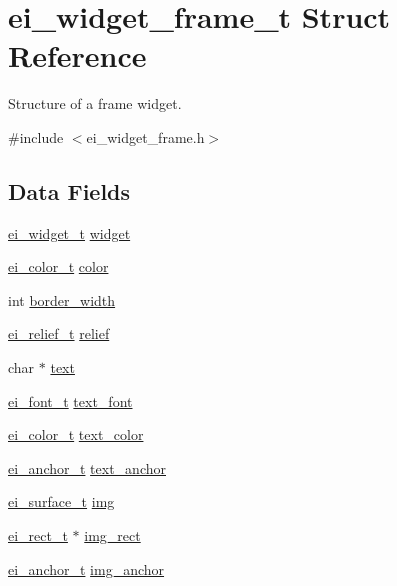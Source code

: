 \hypertarget{structei__widget__frame__t}{\section{ei\-\_\-widget\-\_\-frame\-\_\-t Struct Reference}
\label{structei__widget__frame__t}
}


Structure of a frame widget.  




{\ttfamily \#include $<$ei\-\_\-widget\-\_\-frame.\-h$>$}

\subsection*{Data Fields}
\begin{DoxyCompactItemize}
\item 
\hyperlink{structei__widget__t}{ei\-\_\-widget\-\_\-t} \hyperlink{structei__widget__frame__t_ad375e0d41821e8f1dcf5e061d140ac0d}{widget}
\item 
\hyperlink{structei__color__t}{ei\-\_\-color\-\_\-t} \hyperlink{structei__widget__frame__t_af0d87b04713786c206022aebb27c0647}{color}
\item 
int \hyperlink{structei__widget__frame__t_aa1dbc2d7c29610d5d778afd279137f80}{border\-\_\-width}
\item 
\hyperlink{ei__types_8h_aa79a32b1d8ece0e44cfa394e870b270b}{ei\-\_\-relief\-\_\-t} \hyperlink{structei__widget__frame__t_ac5136274703286fdba8a9de420efc9e4}{relief}
\item 
char $\ast$ \hyperlink{structei__widget__frame__t_a44b96f7744db6a85b1d44195f636c37c}{text}
\item 
\hyperlink{ei__types_8h_a22c8198e4d641e4bc67bb17f9c6bcda7}{ei\-\_\-font\-\_\-t} \hyperlink{structei__widget__frame__t_a6f9e54afa5805784c3feee588832e20d}{text\-\_\-font}
\item 
\hyperlink{structei__color__t}{ei\-\_\-color\-\_\-t} \hyperlink{structei__widget__frame__t_acc7c5954f1ff3e079d40a600755f67d6}{text\-\_\-color}
\item 
\hyperlink{ei__types_8h_a3852c963af609d31d7cfcff79c4c8450}{ei\-\_\-anchor\-\_\-t} \hyperlink{structei__widget__frame__t_a3a69af5f59d337720b4f2b5af3d487bc}{text\-\_\-anchor}
\item 
\hyperlink{hw__interface_8h_ad9970ae727c438faaf09c58c5defb796}{ei\-\_\-surface\-\_\-t} \hyperlink{structei__widget__frame__t_ad50d7cdd8bc27d8f5cf12395c7f6877c}{img}
\item 
\hyperlink{structei__rect__t}{ei\-\_\-rect\-\_\-t} $\ast$ \hyperlink{structei__widget__frame__t_a84c1c35a4c8ed8c0d7f07900d8683fdf}{img\-\_\-rect}
\item 
\hyperlink{ei__types_8h_a3852c963af609d31d7cfcff79c4c8450}{ei\-\_\-anchor\-\_\-t} \hyperlink{structei__widget__frame__t_ab3fa3932c7b01d8495e1f974d02deacc}{img\-\_\-anchor}
\end{DoxyCompactItemize}


